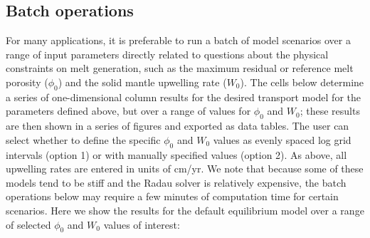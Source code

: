 \documentclass[11pt]{article}
\begin{document}
\bigskip

    \hypertarget{batch-operations}{%
\subsection{Batch operations}\label{batch-operations}}

For many applications, it is preferable to run a batch of model scenarios over a range of input parameters directly related to questions about the physical constraints on melt generation, such as the maximum residual or reference melt porosity ($\phi_0$) and the solid mantle upwelling rate ($W_0$). The cells below determine a series of one-dimensional column results for the desired transport model for the parameters defined above, but over a range of values for $\phi_0$ and $W_0$; these results are then shown in a series of figures and exported as data tables. The user can select whether to define the specific $\phi_0$ and $W_0$ values as evenly spaced log grid intervals (option 1) or with manually specified values (option 2). As above, all upwelling rates are entered in units of cm/yr. We note that because some of these models tend to be stiff and the Radau solver is relatively expensive, the batch operations below may require a few minutes of computation time for certain scenarios. Here we show the results for the default equilibrium model over a range of selected $\phi_0$ and $W_0$ values of interest:
\end{document}
